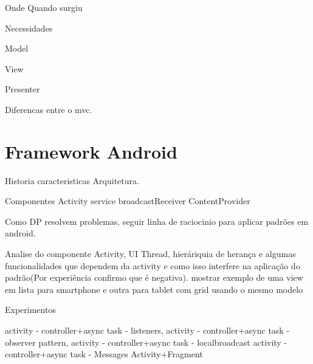 Onde Quando surgiu

Necessidades 

Model

View 

Presenter

Diferencas entre o mvc.

\section{Framework Android}
 
Historia caracteristicas
Arquitetura.

Componentes
	Activity
	service
	broadcastReceiver
	ContentProvider



Como DP resolvem problemas, seguir linha de raciocinio para aplicar padrões em
android.


Analise do componente Activity, UI Thread, hieráriquia de herança e algumas
funcionalidades que dependem da activity e como isso interfere na aplicação do
padrão(Por experiência confirmo que é negativa). mostrar exemplo de uma view em
lista para smartphone e outra para tablet com grid usando o mesmo modelo

Experimentos

activity - controller+async task - listeners,
activity - controller+async task - observer pattern,
activity - controller+async task - localbroadcast
activity - controller+async task - Messages
Activity+Fragment


